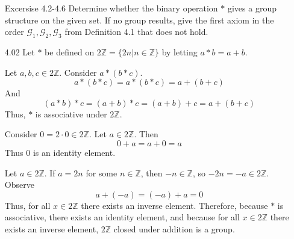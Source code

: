 \documentclass[12pt]{article}
\newcommand{\Z}{\mathds{Z}}
\begin{document}
 \clearpage
	\begin{enumerate}
		
		\item[Excersise 4.2-4.6]Determine whether the binary operation $*$ gives a group structure on the given set. If no group results, give the first axiom in the order $\mathscr{G}_1,\mathscr{G}_2, \mathscr{G}_3$ from Definition 4.1 that does not hold.
			\item[4.02] Let $*$ be defined on $2\Z = \{2n|n\in \Z\}$ by letting $a * b = a + b$.
			
			Let $a,b,c \in 2\Z$.
			Consider $a*(b*c)$. 
			\[a* (b * c) = a * (b*c)= a + (b + c)\]
			And
			\[(a*b)*c = (a+b)*c=(a+b)+c=a+(b+c)\] 
			Thus, $*$ is associative under $ 2\Z $.
			
			Consider $0 = 2\cdot 0 \in 2 \Z$. Let $a \in 2\Z$. Then \[ 0 + a = a + 0 = a\] Thus 0 is an identity element.
			
			Let $a \in 2\Z$. If $a = 2n$ for some $n\in \Z$, then $-n \in \Z$, so $-2n = -a \in 2\Z$. Observe \[a + (-a) = (-a) + a = 0\]
			Thus, for all $x \in 2\Z$ there exists an inverse element.
			Therefore, because $*$ is associative, there exists an identity element, and because for all $x \in 2\Z$ there exists an inverse element, $2\Z$ closed under addition is a group.
			

\end{enumerate}
\end{document}
